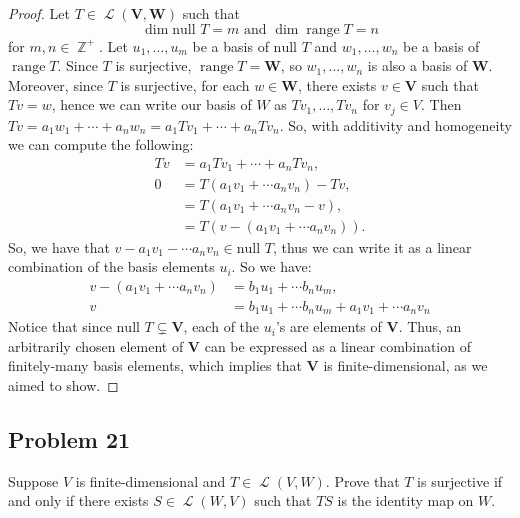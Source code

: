\documentclass[letterpaper, 12pt]{amsart}
\DeclareMathOperator{\Z}{\mathbb{Z}}				%
\DeclareMathOperator{\Ell}{\mathscr{L}}				%
\renewcommand{\null}{\text{null }}					%
\DeclareMathOperator{\range}{\text{range }}			%
\theoremstyle{definition}  							%
\begin{document}
		\begin{proof}
		Let $T \in \Ell(\mathbf{V},\mathbf{W})$ such that $$\dim \null T = m \text{ and } \dim \range T = n$$ for $m,n \in \Z^{+}$.
		Let $u_{1}, \dots, u_{m}$ be a basis of $\null T$ and $w_{1}, \dots, w_{n}$ be a basis of $\range T$.
		Since $T$ is surjective, $\range T = \mathbf{W}$, so $w_{1}, \dots, w_{n}$ is also a basis of $\mathbf{W}$.
		Moreover, since $T$ is surjective, for each $w \in \mathbf{W}$, there exists $v \in \mathbf{V}$ such that $Tv = w$, hence we can write our basis of $W$ as $Tv_{1}, \dots, Tv_{n}$ for $v_{j} \in V$.
		Then $Tv = a_{1}w_{1} + \cdots + a_{n}w_{n} = a_{1}Tv_{1} + \cdots + a_{n}Tv_{n}$.
		So, with additivity and homogeneity we can compute the following:
			\begin{align*}
				Tv &= a_{1}Tv_{1} + \cdots + a_{n}Tv_{n}, \\
				0 &= T(a_{1}v_{1} + \cdots a_{n}v_{n}) - Tv, \\
				&= T(a_{1}v_{1} + \cdots a_{n}v_{n} - v), \\
				&= T(v - (a_{1}v_{1} + \cdots a_{n}v_{n}) ).
			\end{align*}
		So, we have that $v - a_{1}v_{1} - \cdots a_{n}v_{n} \in \null T$, thus we can write it as a linear combination of the basis elements $u_{i}$. 
		So we have:
		\begin{align*}
			v - (a_{1}v_{1} + \cdots a_{n}v_{n}) &= b_{1}u_{1} + \cdots b_{n}u_{m}, \\
			v &= b_{1}u_{1} + \cdots b_{n}u_{m} + a_{1}v_{1} + \cdots a_{n}v_{n}
		\end{align*}
		Notice that since $\null T \subsetneq \mathbf{V}$, each of the $u_{i}$'s are elements of $\mathbf{V}$.
		Thus, an arbitrarily chosen element of $\mathbf{V}$ can be expressed as a linear combination of finitely-many basis elements, which implies that $\mathbf{V}$ is finite-dimensional, as we aimed to show.
		\end{proof}

		\subsection*{Problem 21}
		Suppose $V$ is finite-dimensional and $T \in \Ell(V,W)$. 
		Prove that $T$ is surjective if and only if there exists $S \in \Ell(W,V)$ such that $TS$ is the identity map on $W$.
\end{document}

